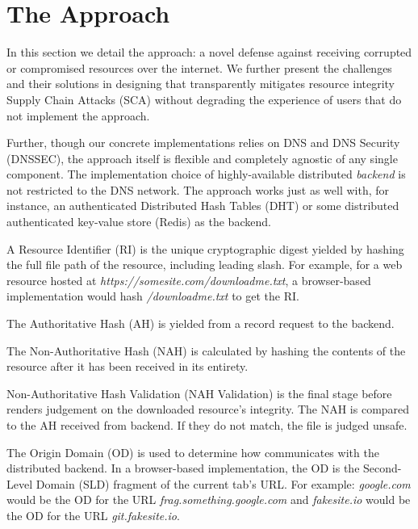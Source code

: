\section{The \SYSTEM{} Approach} \label{sec:approach}

In this section we detail the \SYSTEM{} approach: a novel defense against
receiving corrupted or compromised resources over the internet. We further
present the challenges and their solutions in designing \SYSTEM{} that
transparently mitigates resource integrity Supply Chain Attacks (SCA) without
degrading the experience of users that do not implement the \SYSTEM{} approach.

Further, though our concrete implementations relies on DNS and DNS Security
(DNSSEC), the approach itself is flexible and completely agnostic of any single
component. The implementation choice of highly-available distributed
\emph{backend} is not restricted to the DNS network. The approach works just as
well with, for instance, an authenticated Distributed Hash Tables (DHT) or some
distributed authenticated key-value store (\eg Redis) as the backend.



A Resource Identifier (RI) is the unique cryptographic digest yielded by hashing
the full file path of the resource, including leading slash. For example, for a
web resource hosted at \textit{https://somesite.com/downloadme.txt}, a
browser-based \SYSTEM{} implementation would hash \textit{/downloadme.txt} to
get the RI.

The Authoritative Hash (AH) is yielded from a record request to the backend.

The Non-Authoritative Hash (NAH) is calculated by hashing the contents of the resource after it has been received in its entirety.

Non-Authoritative Hash Validation (NAH Validation) is the final stage before
\SYSTEM{} renders judgement on the downloaded resource's integrity. The NAH is
compared to the AH received from backend. If they do not match, the file is
judged unsafe.

The Origin Domain (OD) is used to determine how \SYSTEM{} communicates with the
distributed backend. In a browser-based implementation, the OD is the
Second-Level Domain (SLD) fragment of the current tab's URL. For example:
\emph{google.com} would be the OD for the URL \emph{frag.something.google.com}
and \emph{fakesite.io} would be the OD for the URL \emph{git.fakesite.io}.



